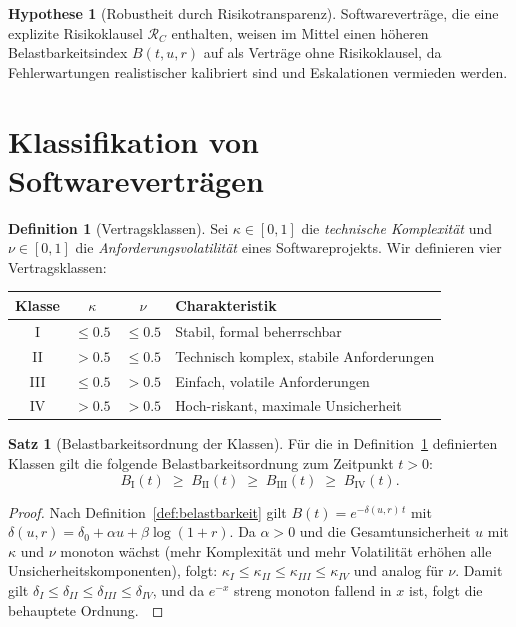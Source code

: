 ﻿\documentclass[a4paper,12pt]{article}
\theoremstyle{definition}
\newtheorem{definition}{Definition}
\newtheorem{satz}{Satz}
\newtheorem{hypothese}{Hypothese}
\newenvironment{beweis}{\begin{proof}}{\end{proof}}
\begin{document}
\begin{hypothese}[Robustheit durch Risikotransparenz]
    Softwarevertr\"age, die eine explizite Risikoklausel $\mathcal{R}_C$ enthalten, weisen
    im Mittel einen h\"oheren Belastbarkeitsindex $B(t, u, r)$ auf als Vertr\"age ohne
    Risikoklausel, da Fehlerwartungen realistischer kalibriert sind und Eskalationen
    vermieden werden.
\end{hypothese}

\section{Klassifikation von Softwarevertr\"agen}

\begin{definition}[Vertragsklassen]
\label{def:klassen}
    Sei $\kappa \in [0,1]$ die \emph{technische Komplexit\"at} und
    $\nu \in [0,1]$ die \emph{Anforderungsvolatili\-t\"at} eines Softwareprojekts.
    Wir definieren vier Vertragsklassen:
    \begin{center}
    \begin{tabular}{c|c|c|l}
        \toprule
        \textbf{Klasse} & $\kappa$ & $\nu$ & \textbf{Charakteristik} \\
        \midrule
        I   & $\leq 0.5$ & $\leq 0.5$ & Stabil, formal beherrschbar \\
        II  & $> 0.5$    & $\leq 0.5$ & Technisch komplex, stabile Anforderungen \\
        III & $\leq 0.5$ & $> 0.5$    & Einfach, volatile Anforderungen \\
        IV  & $> 0.5$    & $> 0.5$    & Hoch-riskant, maximale Unsicherheit \\
        \bottomrule
    \end{tabular}
    \end{center}
\end{definition}

\begin{satz}[Belastbarkeitsordnung der Klassen]
    F\"ur die in Definition~\ref{def:klassen} definierten Klassen gilt die folgende
    Belastbarkeitsordnung zum Zeitpunkt $t > 0$:
    \[
        B_{\mathrm{I}}(t) \;\geq\; B_{\mathrm{II}}(t) \;\geq\; B_{\mathrm{III}}(t)
        \;\geq\; B_{\mathrm{IV}}(t).
    \]
\end{satz}

\begin{beweis}
    Nach Definition~\ref{def:belastbarkeit} gilt $B(t) = e^{-\delta(u,r)\,t}$ mit
    $\delta(u,r) = \delta_0 + \alpha u + \beta \log(1+r)$. Da $\alpha > 0$ und die
    Gesamtunsicherheit $u$ mit $\kappa$ und $\nu$ monoton w\"achst (mehr Komplexit\"at
    und mehr Volatili\-t\"at erh\"ohen alle Unsicherheitskomponenten), folgt:
    $\kappa_I \leq \kappa_{II} \leq \kappa_{III} \leq \kappa_{IV}$ und analog f\"ur $\nu$.
    Damit gilt $\delta_I \leq \delta_{II} \leq \delta_{III} \leq \delta_{IV}$, und
    da $e^{-x}$ streng monoton fallend in $x$ ist, folgt die behauptete Ordnung.
    $\qedhere$
\end{beweis}
\end{document}
